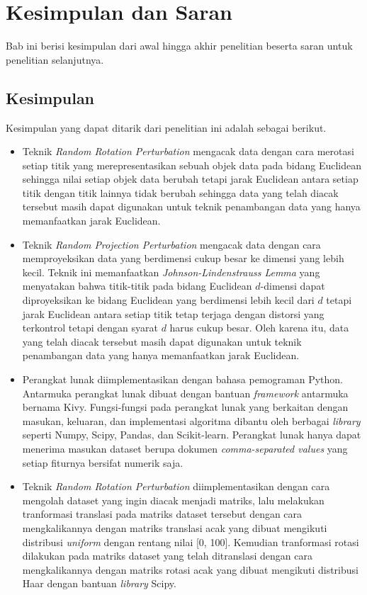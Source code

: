 \chapter{Kesimpulan dan Saran}
\label{chap:kesimpulan-saran}

Bab ini berisi kesimpulan dari awal hingga akhir penelitian beserta saran untuk penelitian selanjutnya.

\section{Kesimpulan}
\label{sec:kesimpulan}

Kesimpulan yang dapat ditarik dari penelitian ini adalah sebagai berikut.
\begin{itemize}
    \item Teknik \textit{Random Rotation Perturbation} mengacak data dengan cara merotasi setiap titik yang merepresentasikan sebuah objek data pada bidang Euclidean sehingga nilai setiap objek data berubah tetapi jarak Euclidean antara setiap titik dengan titik lainnya tidak berubah sehingga data yang telah diacak tersebut masih dapat digunakan untuk teknik penambangan data yang hanya memanfaatkan jarak Euclidean.
    \item Teknik \textit{Random Projection Perturbation} mengacak data dengan cara memproyeksikan data yang berdimensi cukup besar ke dimensi yang lebih kecil. Teknik ini memanfaatkan \textit{Johnson-Lindenstrauss Lemma} yang menyatakan bahwa titik-titik pada bidang Euclidean \(d\)-dimensi dapat diproyeksikan ke bidang Euclidean yang berdimensi lebih kecil dari \(d\) tetapi jarak Euclidean antara setiap titik tetap terjaga dengan distorsi yang terkontrol tetapi dengan syarat \(d\) harus cukup besar. Oleh karena itu, data yang telah diacak tersebut masih dapat digunakan untuk teknik penambangan data yang hanya memanfaatkan jarak Euclidean.
    \item Perangkat lunak diimplementasikan dengan bahasa pemograman Python. Antarmuka perangkat lunak dibuat dengan bantuan \textit{framework} antarmuka bernama Kivy. Fungsi-fungsi pada perangkat lunak yang berkaitan dengan masukan, keluaran, dan implementasi algoritma dibantu oleh berbagai \textit{library} seperti Numpy, Scipy, Pandas, dan Scikit-learn. Perangkat lunak hanya dapat menerima masukan dataset berupa dokumen \textit{comma-separated values} yang setiap fiturnya bersifat numerik saja.
    \item Teknik \textit{Random Rotation Perturbation} diimplementasikan dengan cara mengolah dataset yang ingin diacak menjadi matriks, lalu melakukan tranformasi translasi pada matriks dataset tersebut dengan cara mengkalikannya dengan matriks translasi acak yang dibuat mengikuti distribusi \textit{uniform} dengan rentang nilai [0, 100]. Kemudian tranformasi rotasi dilakukan pada matriks dataset yang telah ditranslasi dengan cara mengkalikannya dengan matriks rotasi acak yang dibuat mengikuti distribusi Haar dengan bantuan \textit{library} Scipy.

\end{itemize}
